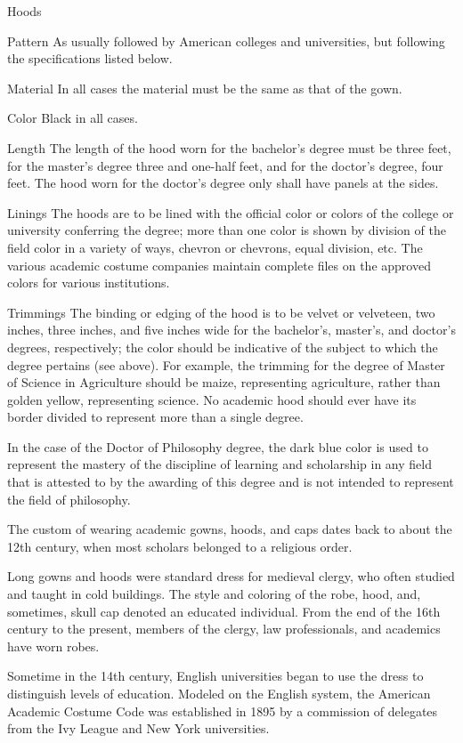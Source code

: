 \documentclass{tufte-handout}
\begin{document}
Hoods

Pattern
As usually followed by American colleges and universities, but following the specifications listed below.

Material
In all cases the material must be the same as that of the gown.
 
Color
Black in all cases.
 
Length
The length of the hood worn for the bachelor's degree must be three feet, for the master's degree three and one-half feet, and for the doctor's degree, four feet. The hood worn for the doctor's degree only shall have panels at the sides.
 
Linings
The hoods are to be lined with the official color or colors of the college or university conferring the degree; more than one color is shown by division of the field color in a variety of ways, chevron or chevrons, equal division, etc. The various academic costume companies maintain complete files on the approved colors for various institutions.
 
Trimmings
The binding or edging of the hood is to be velvet or velveteen, two inches, three inches, and five inches wide for the bachelor's, master's, and doctor's degrees, respectively; the color should be indicative of the subject to which the degree pertains (see above). For example, the trimming for the degree of Master of Science in Agriculture should be maize, representing agriculture, rather than golden yellow, representing science. No academic hood should ever have its border divided to represent more than a single degree.

In the case of the Doctor of Philosophy degree, the dark blue color is used to represent the mastery of the discipline of learning and scholarship in any field that is attested to by the awarding of this degree and is not intended to represent the field of philosophy.


The custom of wearing academic gowns, hoods, and caps dates back to about the 12th century, when most scholars belonged to a religious order.

Long gowns and hoods were standard dress for medieval clergy, who often studied and taught in cold buildings. The style and coloring of the robe, hood, and, sometimes, skull cap denoted an edu­cated individual. From the end of the 16th century to the present, members of the clergy, law profes­sionals, and academics have worn robes.

Sometime in the 14th century, English univer­sities began to use the dress to distinguish levels of education. Modeled on the English system, the American Academic Costume Code was estab­lished in 1895 by a commission of delegates from the Ivy League and New York universities.
\end{document}
